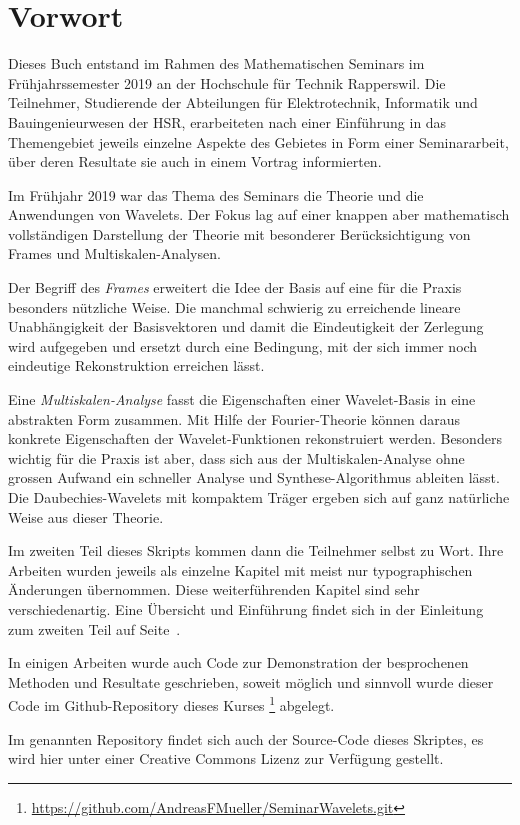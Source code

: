 %
%
%
\chapter*{Vorwort}
\rhead{}
Dieses Buch entstand im Rahmen des Mathematischen Seminars
im Frühjahrssemester 2019 an der Hochschule für Technik Rapperswil.
Die Teilnehmer, Studierende der Abteilungen für Elektrotechnik,
Informatik und Bauingenieurwesen der
HSR, erarbeiteten nach einer Einführung in das Themengebiet jeweils
einzelne Aspekte des Gebietes in Form einer Seminararbeit, über
deren Resultate sie auch in einem Vortrag informierten. 

Im Frühjahr 2019 war das Thema des Seminars die Theorie und die Anwendungen
von Wavelets.
Der Fokus lag auf einer knappen aber mathematisch vollständigen 
Darstellung der Theorie mit besonderer Berücksichtigung von Frames
und Multiskalen-Analysen.

Der Begriff des {\em Frames} erweitert die Idee der Basis auf eine
für die Praxis besonders nützliche Weise.
Die manchmal schwierig zu erreichende lineare Unabhängigkeit der
Basisvektoren und damit die Eindeutigkeit der Zerlegung wird aufgegeben
und ersetzt durch eine Bedingung, mit der sich immer noch eindeutige
Rekonstruktion erreichen lässt.

Eine {\em Multiskalen-Analyse} fasst die Eigenschaften einer Wavelet-Basis
in eine abstrakten Form zusammen.
Mit Hilfe der Fourier-Theorie können daraus konkrete Eigenschaften der
Wavelet-Funk\-tionen rekonstruiert werden.
Besonders wichtig für die Praxis ist aber, dass sich aus der
Multiskalen-Analyse ohne grossen Aufwand ein schneller Analyse und
Synthese-Algorithmus ableiten lässt.
Die Daubechies-Wavelets mit kompaktem Träger ergeben sich auf ganz
natürliche Weise aus dieser Theorie.

Im zweiten Teil dieses Skripts kommen dann die Teilnehmer selbst zu Wort.
Ihre Arbeiten wurden jeweils als einzelne
Kapitel mit meist nur typographischen Änderungen übernommen.
Diese weiterführenden Kapitel sind sehr verschiedenartig.
Eine Übersicht und Einführung findet sich in der Einleitung
zum zweiten Teil auf Seite~\pageref{buch:uebersicht}.

In einigen Arbeiten wurde auch Code zur Demonstration der 
besprochenen Methoden und Resultate geschrieben, soweit
möglich und sinnvoll wurde dieser Code im Github-Repository
dieses Kurses%
\footnote{\url{https://github.com/AndreasFMueller/SeminarWavelets.git}}
\cite{buch:repo}
abgelegt.

Im genannten Repository findet sich auch der Source-Code dieses
Skriptes, es wird hier unter einer Creative Commons Lizenz
zur Verfügung gestellt.




